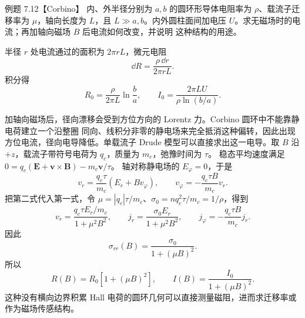 \Needspace{0.46\textheight}
\begin{origexamplebox}{例题 7.12【Corbino】}
内、外半径分别为 $a,b$ 的圆环形导体电阻率为 $\rho$、载流子迁移率为 $\mu$，轴向长度为 $L$，且
$L\gg a,b$。内外圆柱面间加电压 $U$。求无磁场时的电流；再加轴向磁场 $B$ 后电流如何改变，并说明
这种结构的用途。

\begin{center}
\end{center}
\label{fig:em22-question-12}
\end{origexamplebox}

\begin{xesolution}
半径 $r$ 处电流通过的面积为 $2\pi rL$，微元电阻
\[
  \dd R=\frac{\rho\,\dd r}{2\pi rL}.
\]
积分得
\begin{equation}
  R_0=\frac{\rho}{2\pi L}\ln\frac ba,
  \qquad
  \boxed{I_0=\frac{2\pi LU}{\rho\ln(b/a)}}.
\end{equation}

加轴向磁场后，径向漂移会受到方位方向的 Lorentz 力。Corbino 圆环中不能靠静电荷建立一个沿整圈
同向、线积分非零的静电场来完全抵消这种偏转，因此出现方位电流，径向电导降低。单载流子 Drude
模型可以直接求出这一电导。取 $B$ 沿 $+z$，载流子带符号电荷为 $q_c$，质量为 $m_c$，弛豫时间为 $\tau$。
稳态平均速度满足 $0=q_c(\boldsymbol E+\boldsymbol v\times\boldsymbol B)-m_c\boldsymbol v/\tau$。
轴对称静电场的 $E_\varphi=0$，于是
\[
 v_r=\frac{q_c\tau}{m_c}(E_r+Bv_\varphi),\qquad
 v_\varphi=-\frac{q_c\tau B}{m_c}v_r.
\]
把第二式代入第一式，令 $\mu=|q_c|\tau/m_c$、$\sigma_0=nq_c^2\tau/m_c=1/\rho$，得到
\[
 v_r=\frac{q_c\tau E_r/m_c}{1+\mu^2B^2},\qquad
 j_r=\frac{\sigma_0 E_r}{1+\mu^2B^2},\qquad
 j_\varphi=-\frac{q_c\tau B}{m_c}j_r.
\]
因此
\begin{equation}
  \sigma_{rr}(B)=\frac{\sigma_0}{1+(\mu B)^2}.
\end{equation}
所以
\begin{equation}
  \boxed{R(B)=R_0[1+(\mu B)^2]},
  \qquad
  \boxed{I(B)=\frac{I_0}{1+(\mu B)^2}}.
\end{equation}
这种没有横向边界积累 Hall 电荷的圆环几何可以直接测量磁阻，进而求迁移率或作为磁场传感结构。

\corbinoDiagram
\end{xesolution}

